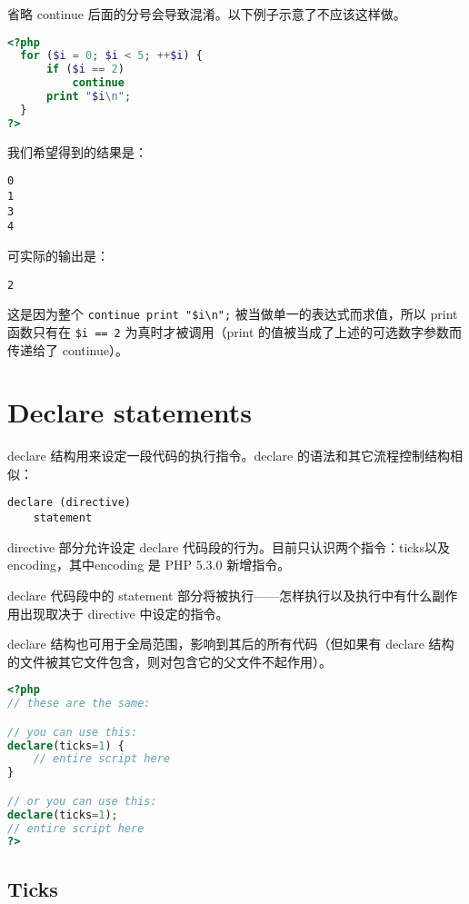 省略 continue 后面的分号会导致混淆。以下例子示意了不应该这样做。

\begin{lstlisting}[language=PHP]
<?php
  for ($i = 0; $i < 5; ++$i) {
      if ($i == 2)
          continue
      print "$i\n";
  }
?>
\end{lstlisting}

我们希望得到的结果是：

\begin{verbatim}
0
1
3
4
\end{verbatim}

可实际的输出是：

\begin{verbatim}
2
\end{verbatim}

这是因为整个 \texttt{continue print "\$i\textbackslash n";} 被当做单一的表达式而求值，所以 print 函数只有在 \texttt{\$i == 2} 为真时才被调用（print 的值被当成了上述的可选数字参数而传递给了 continue）。


\section{Declare statements}

declare 结构用来设定一段代码的执行指令。declare 的语法和其它流程控制结构相似：

\begin{verbatim}
declare (directive)
    statement
\end{verbatim}

directive 部分允许设定 declare 代码段的行为。目前只认识两个指令：ticks以及 encoding，其中encoding 是 PHP 5.3.0 新增指令。

declare 代码段中的 statement 部分将被执行——怎样执行以及执行中有什么副作用出现取决于 directive 中设定的指令。

declare 结构也可用于全局范围，影响到其后的所有代码（但如果有 declare 结构的文件被其它文件包含，则对包含它的父文件不起作用）。

\begin{lstlisting}[language=PHP]
<?php
// these are the same:

// you can use this:
declare(ticks=1) {
    // entire script here
}

// or you can use this:
declare(ticks=1);
// entire script here
?>
\end{lstlisting}

\subsection{Ticks}

